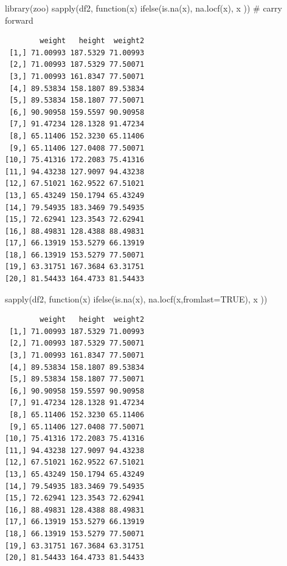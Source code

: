 \documentclass[
  letterpaper,
  DIV=11,
  numbers=noendperiod]{scrreprt}
\newenvironment{Shaded}{\begin{snugshade}}{\end{snugshade}}
\newcommand{\AttributeTok}[1]{\textcolor[rgb]{0.40,0.45,0.13}{#1}}
\newcommand{\CommentTok}[1]{\textcolor[rgb]{0.37,0.37,0.37}{#1}}
\newcommand{\ConstantTok}[1]{\textcolor[rgb]{0.56,0.35,0.01}{#1}}
\newcommand{\ControlFlowTok}[1]{\textcolor[rgb]{0.00,0.23,0.31}{#1}}
\newcommand{\FunctionTok}[1]{\textcolor[rgb]{0.28,0.35,0.67}{#1}}
\newcommand{\NormalTok}[1]{\textcolor[rgb]{0.00,0.23,0.31}{#1}}
\begin{document}
\begin{Shaded}
\begin{Highlighting}[]
\FunctionTok{library}\NormalTok{(zoo)}
\FunctionTok{sapply}\NormalTok{(df2, }\ControlFlowTok{function}\NormalTok{(x) }\FunctionTok{ifelse}\NormalTok{(}\FunctionTok{is.na}\NormalTok{(x), }\FunctionTok{na.locf}\NormalTok{(x), x )) }\CommentTok{\# carry forward}
\end{Highlighting}
\end{Shaded}

\begin{verbatim}
        weight   height  weight2
 [1,] 71.00993 187.5329 71.00993
 [2,] 71.00993 187.5329 77.50071
 [3,] 71.00993 161.8347 77.50071
 [4,] 89.53834 158.1807 89.53834
 [5,] 89.53834 158.1807 77.50071
 [6,] 90.90958 159.5597 90.90958
 [7,] 91.47234 128.1328 91.47234
 [8,] 65.11406 152.3230 65.11406
 [9,] 65.11406 127.0408 77.50071
[10,] 75.41316 172.2083 75.41316
[11,] 94.43238 127.9097 94.43238
[12,] 67.51021 162.9522 67.51021
[13,] 65.43249 150.1794 65.43249
[14,] 79.54935 183.3469 79.54935
[15,] 72.62941 123.3543 72.62941
[16,] 88.49831 128.4388 88.49831
[17,] 66.13919 153.5279 66.13919
[18,] 66.13919 153.5279 77.50071
[19,] 63.31751 167.3684 63.31751
[20,] 81.54433 164.4733 81.54433
\end{verbatim}

\begin{Shaded}
\begin{Highlighting}[]
\FunctionTok{sapply}\NormalTok{(df2, }\ControlFlowTok{function}\NormalTok{(x) }\FunctionTok{ifelse}\NormalTok{(}\FunctionTok{is.na}\NormalTok{(x), }\FunctionTok{na.locf}\NormalTok{(x,}\AttributeTok{fromlast=}\ConstantTok{TRUE}\NormalTok{), x ))}
\end{Highlighting}
\end{Shaded}

\begin{verbatim}
        weight   height  weight2
 [1,] 71.00993 187.5329 71.00993
 [2,] 71.00993 187.5329 77.50071
 [3,] 71.00993 161.8347 77.50071
 [4,] 89.53834 158.1807 89.53834
 [5,] 89.53834 158.1807 77.50071
 [6,] 90.90958 159.5597 90.90958
 [7,] 91.47234 128.1328 91.47234
 [8,] 65.11406 152.3230 65.11406
 [9,] 65.11406 127.0408 77.50071
[10,] 75.41316 172.2083 75.41316
[11,] 94.43238 127.9097 94.43238
[12,] 67.51021 162.9522 67.51021
[13,] 65.43249 150.1794 65.43249
[14,] 79.54935 183.3469 79.54935
[15,] 72.62941 123.3543 72.62941
[16,] 88.49831 128.4388 88.49831
[17,] 66.13919 153.5279 66.13919
[18,] 66.13919 153.5279 77.50071
[19,] 63.31751 167.3684 63.31751
[20,] 81.54433 164.4733 81.54433
\end{verbatim}
\end{document}
